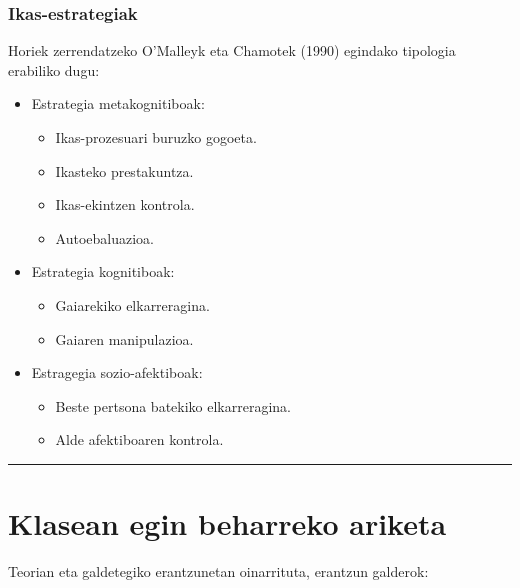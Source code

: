\documentclass[
]{book}
\providecommand{\tightlist}{%
  \setlength{\itemsep}{0pt}\setlength{\parskip}{0pt}}
\begin{document}
\hypertarget{ikas-estrategiak}{%
\subsubsection{Ikas-estrategiak}\label{ikas-estrategiak}}

Horiek zerrendatzeko O'Malleyk eta Chamotek (1990) egindako tipologia erabiliko dugu:

\begin{itemize}
\tightlist
\item
  Estrategia metakognitiboak:

  \begin{itemize}
  \tightlist
  \item
    Ikas-prozesuari buruzko gogoeta.
  \item
    Ikasteko prestakuntza.
  \item
    Ikas-ekintzen kontrola.
  \item
    Autoebaluazioa.
  \end{itemize}
\item
  Estrategia kognitiboak:

  \begin{itemize}
  \tightlist
  \item
    Gaiarekiko elkarreragina.
  \item
    Gaiaren manipulazioa.
  \end{itemize}
\item
  Estragegia sozio-afektiboak:

  \begin{itemize}
  \tightlist
  \item
    Beste pertsona batekiko elkarreragina.
  \item
    Alde afektiboaren kontrola.
  \end{itemize}
\end{itemize}

\begin{center}\rule{0.5\linewidth}{0.5pt}\end{center}

\hypertarget{klasean-egin-beharreko-ariketa}{%
\section*{Klasean egin beharreko ariketa}\label{klasean-egin-beharreko-ariketa}}

Teorian eta galdetegiko erantzunetan oinarrituta, erantzun galderok:
\end{document}
